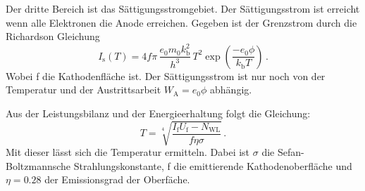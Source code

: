Der dritte Bereich ist das Sättigungsstromgebiet. Der Sättigungsstrom ist erreicht wenn alle Elektronen die Anode erreichen. Gegeben ist der Grenzstrom durch die Richardson Gleichung
\begin{equation}
    I_{\text{s}}(T)=4 f \pi\, \frac{e_0 m_0 k_\text{b}^2}{h^3}\, T^2 \exp \left(\frac{-e_0 \phi}{k_\text{b} T}\right) \, .
    \label{eqn:richard}
\end{equation}
Wobei f die Kathodenfläche ist.
Der Sättigungsstrom ist nur noch von der Temperatur und der Austrittsarbeit $W_\text{A}=e_0 \phi$ abhängig.

Aus der Leistungsbilanz und der Energieerhaltung folgt die Gleichung:
\begin{equation}
    T=\sqrt[4]{\frac{I_\text{f} U_\text{f}- N_\text{WL}}{f \eta \sigma}} \, .
    \label{eqn:ein viertel}
\end{equation}
Mit dieser lässt sich die Temperatur ermitteln.
Dabei ist $\sigma$ die Sefan-Boltzmannsche Strahlungskonstante, f die emittierende Kathodenoberfläche und $\eta=0.28$ der Emissionsgrad der Oberfäche.
